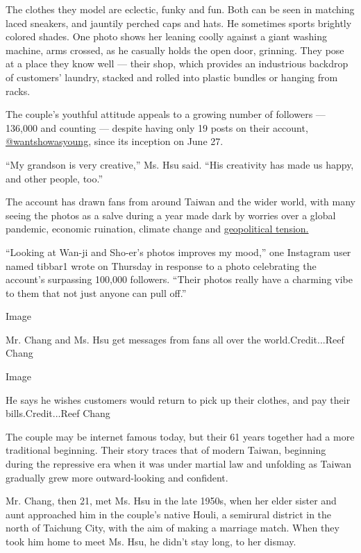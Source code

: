 The clothes they model are eclectic, funky and fun. Both can be seen in
matching laced sneakers, and jauntily perched caps and hats. He
sometimes sports brightly colored shades. One photo shows her leaning
coolly against a giant washing machine, arms crossed, as he casually
holds the open door, grinning. They pose at a place they know well ---
their shop, which provides an industrious backdrop of customers'
laundry, stacked and rolled into plastic bundles or hanging from racks.

The couple's youthful attitude appeals to a growing number of followers
--- 136,000 and counting --- despite having only 19 posts on their
account,
\href{https://www.instagram.com/wantshowasyoung/?hl=en}{@wantshowasyoung},
since its inception on June 27.

``My grandson is very creative,'' Ms. Hsu said. ``His creativity has
made us happy, and other people, too.''

The account has drawn fans from around Taiwan and the wider world, with
many seeing the photos as a salve during a year made dark by worries
over a global pandemic, economic ruination, climate change and
\href{https://www.nytimes.com/2020/07/01/world/asia/taiwan-china-hong-kong.html?searchResultPosition=1}{geopolitical
tension.}

``Looking at Wan-ji and Sho-er's photos improves my mood,'' one
Instagram user named tibbar1 wrote on Thursday in response to a photo
celebrating the account's surpassing 100,000 followers. ``Their photos
really have a charming vibe to them that not just anyone can pull off.''

Image

Mr. Chang and Ms. Hsu get messages from fans all over the
world.Credit...Reef Chang

Image

He says he wishes customers would return to pick up their clothes, and
pay their bills.Credit...Reef Chang

The couple may be internet famous today, but their 61 years together had
a more traditional beginning. Their story traces that of modern Taiwan,
beginning during the repressive era when it was under martial law and
unfolding as Taiwan gradually grew more outward-looking and confident.

Mr. Chang, then 21, met Ms. Hsu in the late 1950s, when her elder sister
and aunt approached him in the couple's native Houli, a semirural
district in the north of Taichung City, with the aim of making a
marriage match. When they took him home to meet Ms. Hsu, he didn't stay
long, to her dismay.

